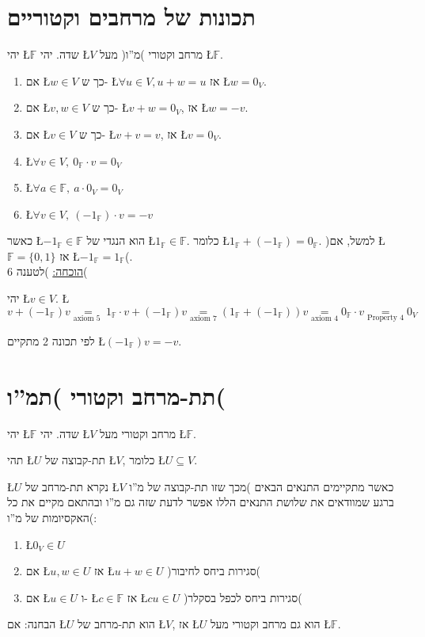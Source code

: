 \documentclass[english,hebrew]{article}
\begin{document}
\section{תכונות של מרחבים וקטוריים}

יהי \L{$\mathbb{F}$} שדה. יהי \L{$V$} מרחב וקטורי )מ\textquotedblright ו(
מעל \L{$\mathbb{F}$}.
\begin{enumerate}
\item אם \L{$w\in V$} כך ש- \L{$\forall u\in V,u+w=u$} אז \L{$w=0_{V}$}.
\item אם \L{$v,w\in V$} כך ש- \L{$v+w=0_{V}$}, אז \L{$w=-v$}.
\item אם \L{$v\in V$} כך ש- \L{$v+v=v$}, אז \L{$v=0_{V}$}.
\item \L{$\forall v\in V,\ 0_{\mathbb{F}}\cdot v=0_{V}$}
\item \L{$\forall a\in\mathbb{F},\ a\cdot0_{V}=0_{V}$}
\item \L{$\forall v\in V,\ (-1_{\mathbb{F}})\cdot v=-v$}
\end{enumerate}
כאשר \L{$-1_{\mathbb{F}}\in\mathbb{F}$} הוא הנגדי של \L{$1_{\mathbb{F}}\in\mathbb{F}$}.
כלומר \L{$1_{\mathbb{F}}+(-1_{\mathbb{F}})=0_{\mathbb{F}}$}. )למשל,
אם \L{$\mathbb{F}=\{0,1\}$} אז \L{$-1_{\mathbb{F}}=1_{\mathbb{F}}$}(.
\\

\underline{הוכחה:} )לטענה 6(

יהי \L{$v\in V$}. \L{%
\[
v+(-1_{\mathbb{F}})v\underset{\text{axiom 5 }}{=}1_{\mathbb{F}}\cdot v+(-1_{\mathbb{F}})v\underset{\text{axiom 7}}{=}(1_{\mathbb{F}}+(-1_{\mathbb{F}}))v\underset{\text{axiom 4}}{=}0_{\mathbb{F}}\cdot v\underset{\text{Property 4}}{=}0_{V}
\]
}%

לפי תכונה 2 מתקיים \L{$(-1_{\mathbb{F}})v=-v$}.

\section{תת-מרחב וקטורי )תמ\textquotedblright ו(}

יהי \L{$\mathbb{F}$} שדה. יהי \L{$V$} מרחב וקטורי מעל \L{$\mathbb{F}$}.

תהי \L{$U$} תת-קבוצה של \L{$V$}, כלומר \L{$U\subseteq V$}.

\L{$U$} נקרא תת-מרחב של \L{$V$} כאשר מתקיימים התנאים הבאים )מכך
שזו תת-קבוצה של מ\textquotedblright ו ברגע שמוודאים את שלושת התנאים
הללו אפשר לדעת שזה גם מ\textquotedblright ו ובהתאם מקיים את כל האקסיומות
של מ\textquotedblright ו(:
\begin{enumerate}
\item \L{$0_{V}\in U$}
\item אם \L{$u,w\in U$} אז \L{$u+w\in U$} )סגירות ביחס לחיבור(
\item אם \L{$u\in U$} ו- \L{$c\in\mathbb{F}$} אז \L{$cu\in U$} )סגירות
ביחס לכפל בסקלר(
\end{enumerate}
הבחנה: אם \L{$U$} הוא תת-מרחב של \L{$V$}, אז \L{$U$} הוא גם מרחב
וקטורי מעל \L{$\mathbb{F}$}.
\end{document}
